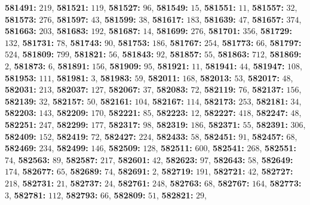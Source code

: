 \textsf{\bfseries 581491:} $219$, \textsf{\bfseries 581521:} $119$, \textsf{\bfseries 581527:} $96$, \textsf{\bfseries 581549:} $15$, \textsf{\bfseries 581551:} $11$, \textsf{\bfseries 581557:} $32$, \textsf{\bfseries 581573:} $276$, \textsf{\bfseries 581597:} $43$, \textsf{\bfseries 581599:} $38$, \textsf{\bfseries 581617:} $183$, \textsf{\bfseries 581639:} $47$, \textsf{\bfseries 581657:} $374$, \textsf{\bfseries 581663:} $203$, \textsf{\bfseries 581683:} $192$, \textsf{\bfseries 581687:} $14$, \textsf{\bfseries 581699:} $276$, \textsf{\bfseries 581701:} $356$, \textsf{\bfseries 581729:} $132$, \textsf{\bfseries 581731:} $78$, \textsf{\bfseries 581743:} $90$, \textsf{\bfseries 581753:} $186$, \textsf{\bfseries 581767:} $254$, \textsf{\bfseries 581773:} $66$, \textsf{\bfseries 581797:} $524$, \textsf{\bfseries 581809:} $799$, \textsf{\bfseries 581821:} $56$, \textsf{\bfseries 581843:} $92$, \textsf{\bfseries 581857:} $55$, \textsf{\bfseries 581863:} $712$, \textsf{\bfseries 581869:} $2$, \textsf{\bfseries 581873:} $6$, \textsf{\bfseries 581891:} $156$, \textsf{\bfseries 581909:} $95$, \textsf{\bfseries 581921:} $11$, \textsf{\bfseries 581941:} $44$, \textsf{\bfseries 581947:} $108$, \textsf{\bfseries 581953:} $111$, \textsf{\bfseries 581981:} $3$, \textsf{\bfseries 581983:} $59$, \textsf{\bfseries 582011:} $168$, \textsf{\bfseries 582013:} $53$, \textsf{\bfseries 582017:} $48$, \textsf{\bfseries 582031:} $213$, \textsf{\bfseries 582037:} $127$, \textsf{\bfseries 582067:} $37$, \textsf{\bfseries 582083:} $72$, \textsf{\bfseries 582119:} $76$, \textsf{\bfseries 582137:} $156$, \textsf{\bfseries 582139:} $32$, \textsf{\bfseries 582157:} $50$, \textsf{\bfseries 582161:} $104$, \textsf{\bfseries 582167:} $114$, \textsf{\bfseries 582173:} $253$, \textsf{\bfseries 582181:} $34$, \textsf{\bfseries 582203:} $143$, \textsf{\bfseries 582209:} $170$, \textsf{\bfseries 582221:} $85$, \textsf{\bfseries 582223:} $12$, \textsf{\bfseries 582227:} $418$, \textsf{\bfseries 582247:} $48$, \textsf{\bfseries 582251:} $247$, \textsf{\bfseries 582299:} $177$, \textsf{\bfseries 582317:} $98$, \textsf{\bfseries 582319:} $186$, \textsf{\bfseries 582371:} $55$, \textsf{\bfseries 582391:} $306$, \textsf{\bfseries 582409:} $152$, \textsf{\bfseries 582419:} $72$, \textsf{\bfseries 582427:} $224$, \textsf{\bfseries 582433:} $58$, \textsf{\bfseries 582451:} $91$, \textsf{\bfseries 582457:} $68$, \textsf{\bfseries 582469:} $234$, \textsf{\bfseries 582499:} $146$, \textsf{\bfseries 582509:} $128$, \textsf{\bfseries 582511:} $600$, \textsf{\bfseries 582541:} $268$, \textsf{\bfseries 582551:} $74$, \textsf{\bfseries 582563:} $89$, \textsf{\bfseries 582587:} $217$, \textsf{\bfseries 582601:} $42$, \textsf{\bfseries 582623:} $97$, \textsf{\bfseries 582643:} $58$, \textsf{\bfseries 582649:} $174$, \textsf{\bfseries 582677:} $65$, \textsf{\bfseries 582689:} $74$, \textsf{\bfseries 582691:} $2$, \textsf{\bfseries 582719:} $191$, \textsf{\bfseries 582721:} $42$, \textsf{\bfseries 582727:} $218$, \textsf{\bfseries 582731:} $21$, \textsf{\bfseries 582737:} $24$, \textsf{\bfseries 582761:} $248$, \textsf{\bfseries 582763:} $68$, \textsf{\bfseries 582767:} $164$, \textsf{\bfseries 582773:} $3$, \textsf{\bfseries 582781:} $112$, \textsf{\bfseries 582793:} $66$, \textsf{\bfseries 582809:} $51$, \textsf{\bfseries 582821:} $29$, 
